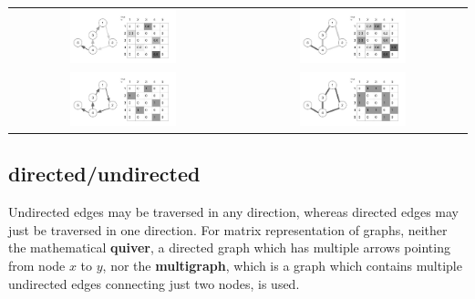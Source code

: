 \begin{table}[H]
  \centering
\begin{tabu}{cc}
	\includegraphics[width=0.49\textwidth]{images/directed_weighted_graph}
	 &
	\includegraphics[width=0.49\textwidth]{images/undirected_weighted_graph} \\
	\includegraphics[width=0.49\textwidth]{images/directed_graph}  &
	\includegraphics[width=0.49\textwidth]{images/undirected_graph} 
\end{tabu}
\end{table}


\subsection{directed/undirected}

Undirected edges may be traversed in any direction, whereas directed edges may just be traversed in one direction. For matrix representation of graphs, neither the mathematical \textbf{quiver}, a directed graph which has multiple arrows pointing from node $x$ to $y$, nor the \textbf{multigraph}, which is a graph which contains multiple undirected edges connecting just two nodes, is used.


